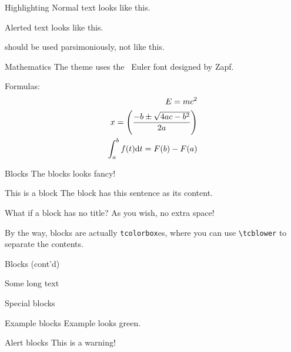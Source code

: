 \documentclass[no-math, aspectratio=1610, 10pt]{beamer}
\begin{document}
    \begin{frame}{Highlighting}
        Normal text looks like this.


        \alert{Alerted text looks like this.}

         should be used \alert{parsimoniously}, not like this.
    \end{frame}

    \begin{frame}{Mathematics}
        The theme uses the \AmS\ Euler font designed by Zapf.

        Formulas:
        \begin{align}
            E = mc^2\\
            {x} = \left(\frac{-b \pm \sqrt{4ac - b^2}}{2a}\right)\\
            \int_a^b f(t){\rm d}t = F(b) - F(a)
        \end{align}
    \end{frame}

    \begin{frame}[fragile]{Blocks}
        The blocks looks fancy!

        \begin{block}{This is a block}
            The block has this sentence as its content.
        \end{block}

        \begin{block}{}
            What if a block has no title?
            \tcblower
            As you wish, no extra space! 
            
            By the way, blocks are actually \texttt{tcolorbox}es, where you can use \verb|\tcblower| to separate the contents.
        \end{block}
    \end{frame}

    \begin{frame}{Blocks (cont'd)}
        \begin{block}{Some long text}
            \lipsum[3]
        \end{block}
    \end{frame}

    \begin{frame}{Special blocks}
        \begin{exampleblock}{Example blocks}
            Example looks green.
        \end{exampleblock}

        \begin{alertblock}{Alert blocks}
            This is a warning!
        \end{alertblock}
    \end{frame}
\end{document}

